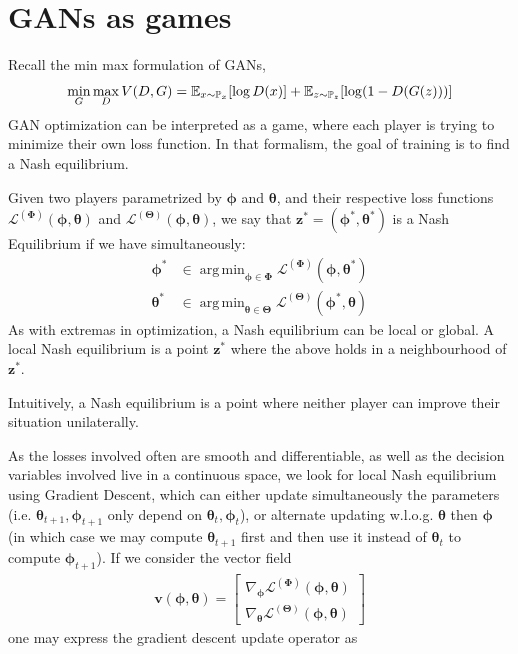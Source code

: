 \documentclass{article}
\DeclareMathOperator*{\argmin}{arg\,min}
\renewcommand{\vec}[1]{\ensuremath{\boldsymbol{#1}}}
\newcommand{\btheta}[0]{\ensuremath{\boldsymbol{\theta}}}
\newcommand{\bphi}[0]{\ensuremath{\boldsymbol{\phi}}}
\newcommand{\ltheta}[0]{\ensuremath{\mathcal{L}^{(\boldsymbol{\Theta})}}}
\newcommand{\lphi}[0]{\ensuremath{\mathcal{L}^{(\boldsymbol{\Phi})}}}
\newcommand{\phth}[0]{\ensuremath{(\boldsymbol{\phi}, \boldsymbol{\theta})}}
\begin{document}
\section{GANs as games}
Recall the min max formulation of GANs,
\begin{equation}
    \min_G \max_D V(D, G) = \mathbb{E}_{x \sim \mathbb{P}_x} [\log D(x)] + \mathbb{E}_{z \sim \mathbb{P}_z} [\log (1-D(G(z)))]
\end{equation}
GAN optimization can be interpreted as a game, where each player is trying to minimize their own loss function. In that formalism, the goal of training is to find a Nash equilibrium.
\begin{defn}
    Given two players parametrized by $\bphi$ and $\btheta$, and their respective loss functions $\lphi \phth$ and $\ltheta \phth$, we say that $\vec{z^*} = (\bphi^*, \btheta^*)$ is a Nash Equilibrium if we have simultaneously:
    \begin{align}
        \bphi^* &\in \argmin_{\bphi\in \vec{\Phi}} \lphi (\bphi, \btheta^*) \nonumber \\
        \btheta^* &\in \argmin_{\btheta\in \vec{\Theta}} \ltheta (\bphi^*, \btheta)
    \end{align}
    As with extremas in optimization, a Nash equilibrium can be local or global. A local Nash equilibrium is a point $\vec{z}^*$ where the above holds in a neighbourhood of $\vec{z}^*$.
\end{defn}
Intuitively, a Nash equilibrium is a point where neither player can improve their situation unilaterally. \\
\par
As the losses involved often are smooth and differentiable, as well as the decision variables involved live in a continuous space, we look for local Nash equilibrium using Gradient Descent, which can either update simultaneously the parameters (i.e. $\btheta_{t+1}, \bphi_{t+1}$ only depend on $\btheta_t, \bphi_t$), or alternate updating w.l.o.g. $\btheta$ then $\bphi$ (in which case we may compute $\btheta_{t+1}$ first and then use it instead of $\btheta_t$ to compute $\bphi_{t+1}$). If we consider the vector field
\begin{align}
    \vec{v}\phth = 
    \begin{bmatrix}
        \nabla_{\bphi} \lphi \phth \\
        \nabla_{\btheta} \ltheta \phth
    \end{bmatrix}
\end{align}
one may express the gradient descent update operator as 
\end{document}
